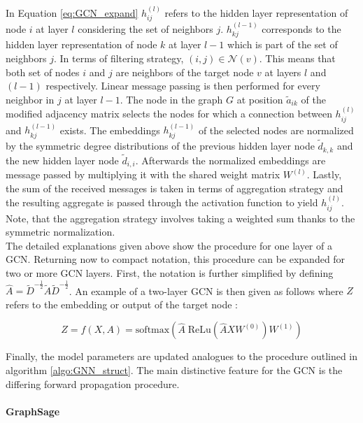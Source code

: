 	\noindent In Equation \ref{eq:GCN_expand} $h_{ij}^{(l)}$ refers to the 
	hidden layer representation of node $i$ at layer $l$ considering the set of
	neighbors $j$. $h_{kj}^{(l-1)}$ corresponds to the hidden layer
	representation of node $k$ at layer $l-1$ which is part of the set of 
	neighbors $j$. In terms of filtering strategy, $(i,j) \in \mathcal{N}(v)$. 
	This means that both set of nodes $i$ and $j$ are neighbors of the target 
	node $v$ at layers $l$ and $(l-1)$ respectively. Linear message
	passing is then performed for every neighbor in $j$ at layer $l-1$. The node 
	in the graph $G$ at position $\tilde a_{ik}$ of the modified adjacency matrix 
	selects the nodes for which a connection between $h_{ij}^{(l)}$ and
	$h_{kj}^{(l-1)}$ exists. The embeddings $h_{kj}^{(l-1)}$ of the selected 
	nodes are normalized by the symmetric degree distributions of the previous 
	hidden layer node $\tilde d_{k,k}$ and the new hidden layer node $\tilde d_{i,i}$.
	Afterwards the normalized embeddings are message passed by multiplying it
	with the shared weight matrix $W^{(l)}$. Lastly, the sum of the received
	messages is taken in terms of aggregation strategy and the resulting
	aggregate is passed through the activation function to yield $h_{ij}^{(l)}$.
	Note, that the aggregation strategy involves taking a weighted sum thanks
	to the symmetric normalization. \\

	\noindent The detailed explanations given above show the procedure for
	one layer of a GCN. Returning now to compact notation, this procedure can be
	expanded for two or more GCN layers. First, the notation is further
	simplified by defining $\hat A = \tilde D^{-\frac{1}{2}}\tilde A \tilde
	D^{-\frac{1}{2}}$. An example of a two-layer GCN is then given as follows 
	where $Z$ refers to the embedding or output of the target node 
	\citep[p. 3]{kipf2016semi}:

	\begin{equation}
		Z = f(X,A) = \text{softmax}\left(\hat A \;\text{ReLu}\left(\hat A X
		W^{(0)}\right)W^{(1)}\right)
	\label{eq:GCN_forward}
	\end{equation}

	\noindent Finally, the model parameters are updated analogues to the
	procedure outlined in algorithm \ref{algo:GNN_struct}. The main distinctive
	feature for the GCN is the differing forward propagation procedure. 

	\paragraph{GraphSage} \mbox{}\\
	
